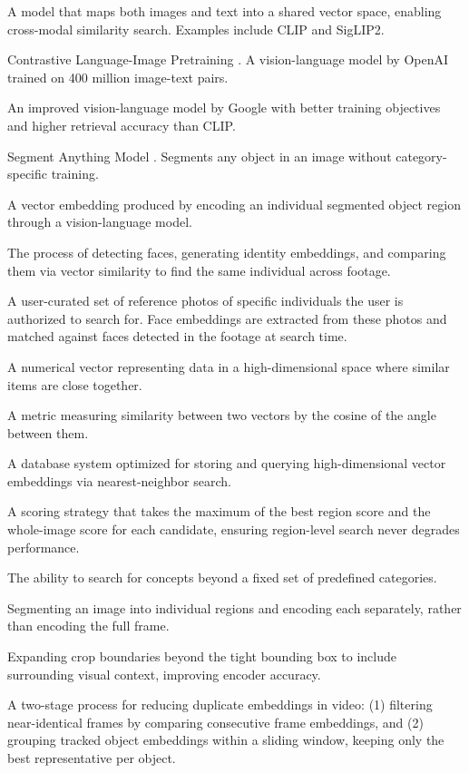 \begin{description}[style=nextline, leftmargin=2cm]
    \item[Vision-Language Model] A model that maps both images and text into a shared vector space, enabling cross-modal similarity search. Examples include CLIP and SigLIP2.
    \item[CLIP] Contrastive Language-Image Pretraining \cite{radford2021learning}. A vision-language model by OpenAI trained on 400 million image-text pairs.
    \item[SigLIP2] An improved vision-language model by Google \cite{zhai2025siglip2} with better training objectives and higher retrieval accuracy than CLIP.
    \item[SAM] Segment Anything Model \cite{kirillov2023segment}. Segments any object in an image without category-specific training.
    \item[Object Region Embedding] A vector embedding produced by encoding an individual segmented object region through a vision-language model.
    \item[Face Similarity] The process of detecting faces, generating identity embeddings, and comparing them via vector similarity to find the same individual across footage.
    \item[Watchlist] A user-curated set of reference photos of specific individuals the user is authorized to search for. Face embeddings are extracted from these photos and matched against faces detected in the footage at search time.
    \item[Embedding] A numerical vector representing data in a high-dimensional space where similar items are close together.
    \item[Cosine Similarity] A metric measuring similarity between two vectors by the cosine of the angle between them.
    \item[Vector Database] A database system optimized for storing and querying high-dimensional vector embeddings via nearest-neighbor search.
    \item[Hybrid Scoring] A scoring strategy that takes the maximum of the best region score and the whole-image score for each candidate, ensuring region-level search never degrades performance.
    \item[Open Vocabulary] The ability to search for concepts beyond a fixed set of predefined categories.
    \item[Region-Level Search] Segmenting an image into individual regions and encoding each separately, rather than encoding the full frame.
    \item[Context Padding] Expanding crop boundaries beyond the tight bounding box to include surrounding visual context, improving encoder accuracy.
    \item[Rule-Based Deduplication] A two-stage process for reducing duplicate embeddings in video: (1) filtering near-identical frames by comparing consecutive frame embeddings, and (2) grouping tracked object embeddings within a sliding window, keeping only the best representative per object.
\end{description}

